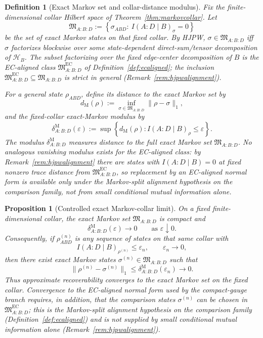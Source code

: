 \documentclass[11pt]{article}
\newtheorem{proposition}[theorem]{Proposition}
\newtheorem{definition}[theorem]{Definition}
\begin{document}
\begin{definition}[Exact Markov set and collar-distance modulus]\label{def:markovmodulus}
Fix the finite-dimensional collar Hilbert space of Theorem~\ref{thm:markovcollar}. Let
\[
\mathfrak M_{A:B:D}
:=
\left\{
\sigma_{ABD}:\ I(A:D\mid B)_\sigma=0
\right\}
\]
be the set of exact Markov states on that fixed collar. By HJPW, \(\sigma\in\mathfrak M_{A:B:D}\) iff \(\sigma\) factorizes blockwise over \emph{some} state-dependent direct-sum/tensor decomposition of \(\mathcal H_B\). The subset factorizing over the fixed edge-center decomposition of \(B\) is the EC-aligned class \(\mathfrak M^{\mathrm{EC}}_{A:B:D}\) of Definition~\ref{def:ecaligned}; the inclusion \(\mathfrak M^{\mathrm{EC}}_{A:B:D}\subseteq \mathfrak M_{A:B:D}\) is strict in general (Remark~\ref{rem:hjpwalignment}).

For a general state \(\rho_{ABD}\), define its distance to the exact Markov set by
\[
d_{\mathrm M}(\rho):=\inf_{\sigma\in\mathfrak M_{A:B:D}}\|\rho-\sigma\|_1,
\]
and the fixed-collar exact-Markov modulus by
\[
\delta^{\mathrm M}_{A:B:D}(\varepsilon)
:=
\sup\left\{
d_{\mathrm M}(\rho):
I(A:D\mid B)_\rho\le \varepsilon
\right\}.
\]
The modulus \(\delta^{\mathrm M}_{A:B:D}\) measures distance to the full exact Markov set \(\mathfrak M_{A:B:D}\). No analogous vanishing modulus exists for the EC-aligned class: by Remark~\ref{rem:hjpwalignment} there are states with \(I(A:D\mid B)=0\) at fixed nonzero trace distance from \(\mathfrak M^{\mathrm{EC}}_{A:B:D}\), so replacement by an EC-aligned normal form is available only under the Markov-split alignment hypothesis on the comparison family, not from small conditional mutual information alone.
\end{definition}

\begin{proposition}[Controlled exact Markov-collar limit]\label{prop:controlledmarkov}
On a fixed finite-dimensional collar, the exact Markov set \(\mathfrak M_{A:B:D}\) is compact and
\[
\delta^{\mathrm M}_{A:B:D}(\varepsilon)\longrightarrow 0
\qquad
\text{as }\varepsilon\downarrow 0.
\]
Consequently, if \(\rho^{(n)}_{ABD}\) is any sequence of states on that same collar with
\[
I(A:D\mid B)_{\rho^{(n)}}\le \varepsilon_n,
\qquad
\varepsilon_n\to0,
\]
then there exist exact Markov states \(\sigma^{(n)}\in\mathfrak M_{A:B:D}\) such that
\[
\|\rho^{(n)}-\sigma^{(n)}\|_1
\le
\delta^{\mathrm M}_{A:B:D}(\varepsilon_n)
\longrightarrow 0.
\]
Thus approximate recoverability converges to the exact Markov set on the fixed collar. Convergence to the EC-aligned normal form used by the compact-gauge branch requires, in addition, that the comparison states \(\sigma^{(n)}\) can be chosen in \(\mathfrak M^{\mathrm{EC}}_{A:B:D}\); this is the Markov-split alignment hypothesis on the comparison family (Definition~\ref{def:ecaligned}) and is not supplied by small conditional mutual information alone (Remark~\ref{rem:hjpwalignment}).
\end{proposition}
\end{document}
